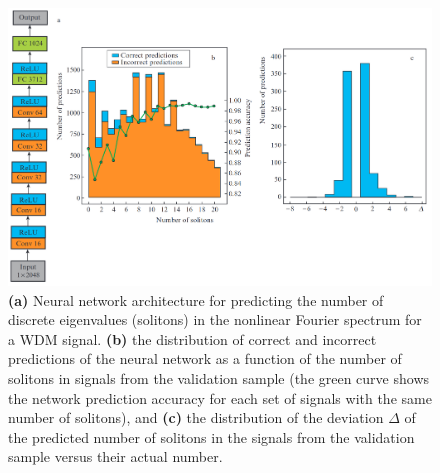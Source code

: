 \begin{figure}
    \centering
    \includegraphics[width=1.0\linewidth]{images/nn_discrete/discrete_result.png}
    \caption{\textbf{(a)} Neural network architecture for predicting the number of discrete eigenvalues (solitons) in the nonlinear Fourier spectrum for a WDM signal. \textbf{(b)} the distribution of correct and incorrect predictions of the neural network as a function of the number of solitons in signals from the validation sample (the green curve shows the network prediction accuracy for each set of signals with the same number of solitons), and \textbf{(c)} the distribution of the deviation $\Delta$ of the predicted number of solitons in the signals from the validation sample versus their actual
number.}
    \label{fig:nn_discrete_result}
\end{figure}

